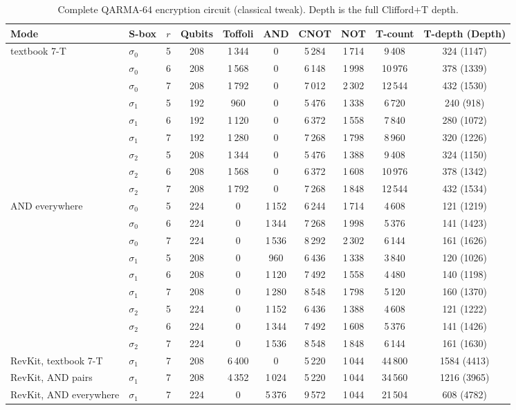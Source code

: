 \documentclass[runningheads,10pt]{llncs}
\begin{document}
\begin{table}[htbp]
\centering
\caption{Complete QARMA-64 encryption circuit (classical tweak). Depth is the full Clifford+T depth.}
\label{tab:full-circuit}
\scriptsize
\begin{tabular}{llcccccccc}
\toprule
Mode & S-box & $r$ & Qubits & Toffoli & AND & CNOT & NOT & T-count & T-depth (Depth) \\
\midrule
\multirow{9}{*}{textbook 7-T}
& $\sigma_0$ & 5 & 208 & 1\,344 & 0 & 5\,284 & 1\,714 & 9\,408 & 324 (1147) \\
& $\sigma_0$ & 6 & 208 & 1\,568 & 0 & 6\,148 & 1\,998 & 10\,976 & 378 (1339) \\
& $\sigma_0$ & 7 & 208 & 1\,792 & 0 & 7\,012 & 2\,302 & 12\,544 & 432 (1530) \\
& $\sigma_1$ & 5 & 192 & 960 & 0 & 5\,476 & 1\,338 & 6\,720 & 240 (918) \\
& $\sigma_1$ & 6 & 192 & 1\,120 & 0 & 6\,372 & 1\,558 & 7\,840 & 280 (1072) \\
& $\sigma_1$ & 7 & 192 & 1\,280 & 0 & 7\,268 & 1\,798 & 8\,960 & 320 (1226) \\
& $\sigma_2$ & 5 & 208 & 1\,344 & 0 & 5\,476 & 1\,388 & 9\,408 & 324 (1150) \\
& $\sigma_2$ & 6 & 208 & 1\,568 & 0 & 6\,372 & 1\,608 & 10\,976 & 378 (1342) \\
& $\sigma_2$ & 7 & 208 & 1\,792 & 0 & 7\,268 & 1\,848 & 12\,544 & 432 (1534) \\
\midrule
\multirow{9}{*}{AND everywhere}
& $\sigma_0$ & 5 & 224 & 0 & 1\,152 & 6\,244 & 1\,714 & 4\,608 & 121 (1219) \\
& $\sigma_0$ & 6 & 224 & 0 & 1\,344 & 7\,268 & 1\,998 & 5\,376 & 141 (1423) \\
& $\sigma_0$ & 7 & 224 & 0 & 1\,536 & 8\,292 & 2\,302 & 6\,144 & 161 (1626) \\
& $\sigma_1$ & 5 & 208 & 0 & 960 & 6\,436 & 1\,338 & 3\,840 & 120 (1026) \\
& $\sigma_1$ & 6 & 208 & 0 & 1\,120 & 7\,492 & 1\,558 & 4\,480 & 140 (1198) \\
& $\sigma_1$ & 7 & 208 & 0 & 1\,280 & 8\,548 & 1\,798 & 5\,120 & 160 (1370) \\
& $\sigma_2$ & 5 & 224 & 0 & 1\,152 & 6\,436 & 1\,388 & 4\,608 & 121 (1222) \\
& $\sigma_2$ & 6 & 224 & 0 & 1\,344 & 7\,492 & 1\,608 & 5\,376 & 141 (1426) \\
& $\sigma_2$ & 7 & 224 & 0 & 1\,536 & 8\,548 & 1\,848 & 6\,144 & 161 (1630) \\
\midrule
RevKit, textbook 7-T & $\sigma_1$ & 7 & 208 & 6\,400 & 0 & 5\,220 & 1\,044 & 44\,800 & 1584 (4413) \\
RevKit, AND pairs & $\sigma_1$ & 7 & 208 & 4\,352 & 1\,024 & 5\,220 & 1\,044 & 34\,560 & 1216 (3965) \\
RevKit, AND everywhere & $\sigma_1$ & 7 & 224 & 0 & 5\,376 & 9\,572 & 1\,044 & 21\,504 & 608 (4782) \\
\bottomrule
\end{tabular}
\end{table}
\end{document}
